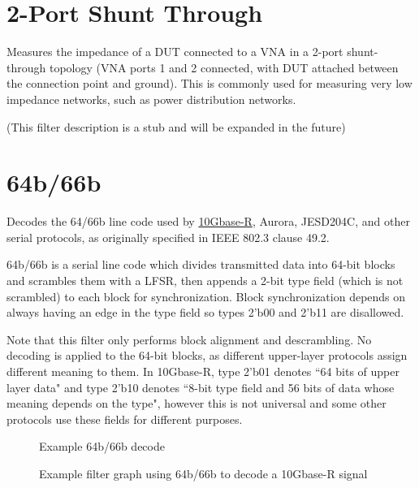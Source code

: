 \pagebreak
\section{2-Port Shunt Through}
\label{filter:2portshuntthrough}

Measures the impedance of a DUT connected to a VNA in a 2-port shunt-through topology (VNA ports 1 and 2 connected,
with DUT attached between the connection point and ground). This is commonly used for measuring very low impedance
networks, such as power distribution networks.

(This filter description is a stub and will be expanded in the future)

\pagebreak
\section{64b/66b}
\label{filter:64b66b}

Decodes the 64/66b line code used by \hyperref[filter:10gbaser]{10Gbase-R}, Aurora, JESD204C, and other serial
protocols, as originally specified in IEEE 802.3 clause 49.2.

64b/66b is a serial line code which divides transmitted data into 64-bit blocks and scrambles them with a LFSR, then
appends a 2-bit type field (which is not scrambled) to each block for synchronization. Block synchronization depends on
always having an edge in the type field so types 2'b00 and 2'b11 are disallowed.

Note that this filter only performs block alignment and descrambling. No decoding is applied to the 64-bit blocks, as
different upper-layer protocols assign different meaning to them. In 10Gbase-R, type 2'b01 denotes ``64 bits of upper
layer data" and type 2'b10 denotes ``8-bit type field and 56 bits of data whose meaning depends on the type", however
this is not universal and some other protocols use these fields for different purposes.

\begin{figure}[h]
\centering
{}
\caption{Example 64b/66b decode}
\label{filter_64b66b}
\end{figure}

\begin{figure}[h]
\centering
{}
\caption{Example filter graph using 64b/66b to decode a 10Gbase-R signal}
\label{filter_graph_64b66b}
\end{figure}

